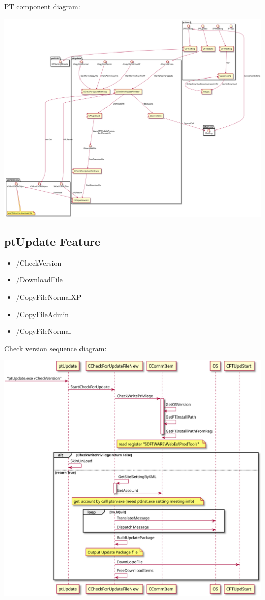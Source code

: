 \documentclass[letterpaper,10pt,english]{sphinxmanual}
\begin{document}
PT component diagram:

\includegraphics{pt_component.svg}


\subsection{ptUpdate Feature}
\label{pt:ptupdate-feature}\begin{itemize}
\item {} 
/CheckVersion

\item {} 
/DownloadFile

\item {} 
/CopyFileNormalXP

\item {} 
/CopyFileAdmin

\item {} 
/CopyFileNormal

\end{itemize}

Check version sequence diagram:

\includegraphics{ptupdate_check_version_seq.svg}
\end{document}
